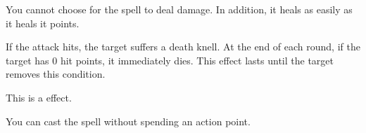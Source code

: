 
You cannot choose for the spell to deal damage.
In addition, it heals  as easily as it heals it points.







If the attack hits, the target suffers a death knell.
At the end of each round, if the target has 0 hit points, it immediately dies.
This effect lasts until the target removes this condition.



\par


This is a  effect.


You can cast the spell without spending an action point.




